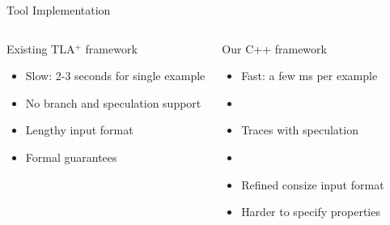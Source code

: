 \documentclass{beamer}
\newcommand{\cmark}{\textcolor{green!70!black}{\ding{51}}} %
\newcommand{\xmark}{\textcolor{red}{\ding{55}}}            %
\begin{document}
\begin{frame}{Tool Implementation}


    

    \begin{columns}
        \begin{exampleblock}{Existing TLA$^+$ framework}

            \begin{itemize}
                \item[\xmark] Slow: 2-3 seconds for single example
                \item[\xmark] No branch and speculation support
                \item[\xmark] Lengthy input format 
                \item[\cmark] Formal guarantees
            \end{itemize}

            
        \end{exampleblock}

        \pause
        \begin{exampleblock}{Our C++ framework}
            \begin{itemize}
                \item[\cmark] Fast: a few ms per example
                \item[ ]
                \item[\cmark] Traces with speculation
                \item[ ] 
                \item[\cmark] Refined consize input format
                \item[\xmark] Harder to specify properties
            \end{itemize}
        \end{exampleblock}
    \end{columns}

\end{frame}
\end{document}
